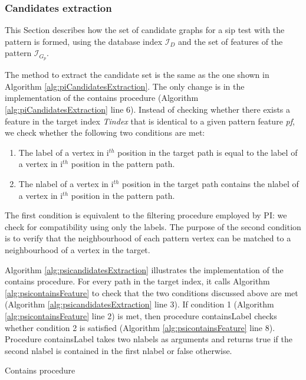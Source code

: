 \documentclass{l4proj}
\newcommand{\fancyI}{\mathcal{I}}
\begin{document}
\subsubsection{Candidates extraction}
\label{pi:candExtr}
This Section describes how the set of candidate graphs for a \gls{sip} test with the pattern is formed, using the database index $\fancyI_{D}$ and the set of features of the pattern $\fancyI_{G_{p}}$.

The method to extract the candidate set is the same as the one shown in Algorithm \ref{alg:piCandidatesExtraction}. The only change is in the implementation of the contains procedure (Algorithm \ref{alg:piCandidatesExtraction} line 6). Instead of checking whether there exists a feature in the target index \emph{Tindex} that is identical to a given pattern feature \emph{pf}, we check whether the following two conditions are met:
\begin{enumerate}
\item The label of a vertex in i$^{th}$ position in the target path is equal to the label of a vertex in i$^{th}$ position in the pattern path.
\item The nlabel of a vertex in  i$^{th}$ position in the target path contains the nlabel of a vertex in i$^{th}$ position in the pattern path.
\end{enumerate}

The first condition is equivalent to the filtering procedure employed by PI: we check for compatibility using only the labels. The purpose of the second condition is to verify that the neighbourhood of each pattern vertex can be matched to a neighbourhood of a vertex in the target.

Algorithm \ref{alg:psicandidatesExtraction} illustrates the implementation of the contains procedure. For every path in the target index, it calls Algorithm \ref{alg:psicontainsFeature} to check that the two conditions discussed above are met (Algorithm \ref{alg:psicandidatesExtraction} line 3). If condition 1 (Algorithm \ref{alg:psicontainsFeature} line 2) is met, then procedure containsLabel checks whether condition 2 is satisfied (Algorithm \ref{alg:psicontainsFeature} line 8). Procedure containsLabel takes two nlabels as arguments and returns true if the second nlabel is contained in the first nlabel or false otherwise.
\begin{algorithm}
\centering
\caption{Contains procedure}
\label{alg:psicandidatesExtraction}
\begin{algorithmic}[1]
 
    \EndIf
\EndFor
{}
\EndProcedure
\end{algorithmic}
\end{algorithm}
\end{document}
